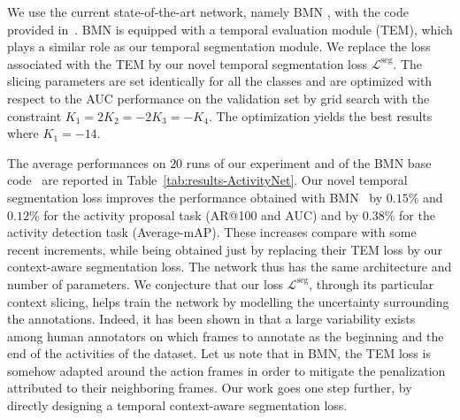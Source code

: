 \documentclass[10pt,twocolumn,letterpaper]{article}
\begin{document}
We use the current state-of-the-art network, namely BMN \cite{Lin_2019_ICCV}, with the code provided in~\cite{BMNCode}. BMN is equipped with a temporal evaluation module (TEM), which plays a similar role as our temporal segmentation module. We replace the loss associated with the TEM by our novel temporal segmentation loss $\mathcal{L}^\text{seg}$. The slicing parameters are set identically for all the classes and are optimized with respect to the AUC performance on the validation set by grid search with the constraint $K_1 = 2 K_2 = -2 K_3 = -K_4$. The optimization yields the best results where $K_1 = -14$.



The average performances on $20$ runs of our experiment and of the BMN base code~\cite{BMNCode} are reported in Table~\ref{tab:results-ActivityNet}. Our novel temporal segmentation loss improves the performance obtained with BMN~\cite{BMNCode} by $0.15\%$ and $0.12\%$ for the activity proposal task (AR@100 and AUC) and by $0.38\%$ for the activity detection task (Average-mAP). These increases compare with some recent increments, while being obtained just by replacing their TEM loss by our context-aware segmentation loss. The network thus has the same architecture and number of parameters. We conjecture that our loss $\mathcal{L}^\text{seg}$, through its particular context slicing, helps train the network by modelling the uncertainty surrounding the annotations. Indeed, it has been shown in \cite{alwassel2018diagnosing,sigurdsson2017actions} that a large variability exists among human annotators on which frames to annotate as the beginning and the end of the activities of the dataset. Let us note that in BMN, the TEM loss is somehow adapted around the action frames in order to mitigate the penalization attributed to their neighboring frames. Our work goes one step further, by directly designing a temporal context-aware segmentation loss.
\end{document}
